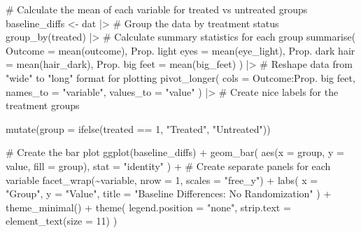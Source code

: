 \documentclass[
  letterpaper,
  DIV=11,
  numbers=noendperiod]{scrreprt}
\newenvironment{Shaded}{\begin{snugshade}}{\end{snugshade}}
\newcommand{\AttributeTok}[1]{\textcolor[rgb]{0.40,0.45,0.13}{#1}}
\newcommand{\CommentTok}[1]{\textcolor[rgb]{0.37,0.37,0.37}{#1}}
\newcommand{\DecValTok}[1]{\textcolor[rgb]{0.68,0.00,0.00}{#1}}
\newcommand{\FunctionTok}[1]{\textcolor[rgb]{0.28,0.35,0.67}{#1}}
\newcommand{\NormalTok}[1]{\textcolor[rgb]{0.00,0.23,0.31}{#1}}
\newcommand{\OtherTok}[1]{\textcolor[rgb]{0.00,0.23,0.31}{#1}}
\newcommand{\SpecialCharTok}[1]{\textcolor[rgb]{0.37,0.37,0.37}{#1}}
\newcommand{\StringTok}[1]{\textcolor[rgb]{0.13,0.47,0.30}{#1}}
\newcounter{none} %
\begin{document}
\begin{Shaded}
\begin{Highlighting}[]
\CommentTok{\# Calculate the mean of each variable for treated vs untreated groups}
\NormalTok{baseline\_diffs }\OtherTok{\textless{}{-}}\NormalTok{ dat }\SpecialCharTok{|\textgreater{}}
  \CommentTok{\# Group the data by treatment status}
  \FunctionTok{group\_by}\NormalTok{(treated) }\SpecialCharTok{|\textgreater{}}
  \CommentTok{\# Calculate summary statistics for each group}
  \FunctionTok{summarise}\NormalTok{(}
    \AttributeTok{Outcome =} \FunctionTok{mean}\NormalTok{(outcome),}
    \StringTok{\textasciigrave{}}\AttributeTok{Prop. light eyes}\StringTok{\textasciigrave{}} \OtherTok{=} \FunctionTok{mean}\NormalTok{(eye\_light),}
    \StringTok{\textasciigrave{}}\AttributeTok{Prop. dark hair}\StringTok{\textasciigrave{}} \OtherTok{=} \FunctionTok{mean}\NormalTok{(hair\_dark),}
    \StringTok{\textasciigrave{}}\AttributeTok{Prop. big feet}\StringTok{\textasciigrave{}} \OtherTok{=} \FunctionTok{mean}\NormalTok{(big\_feet)}
\NormalTok{  ) }\SpecialCharTok{|\textgreater{}}
  \CommentTok{\# Reshape data from "wide" to "long" format for plotting}
  \FunctionTok{pivot\_longer}\NormalTok{(}
    \AttributeTok{cols =}\NormalTok{ Outcome}\SpecialCharTok{:}\StringTok{\textasciigrave{}}\AttributeTok{Prop. big feet}\StringTok{\textasciigrave{}}\NormalTok{,}
    \AttributeTok{names\_to =} \StringTok{"variable"}\NormalTok{,}
    \AttributeTok{values\_to =} \StringTok{"value"}
\NormalTok{  ) }\SpecialCharTok{|\textgreater{}}
  \CommentTok{\# Create nice labels for the treatment groups}

  \FunctionTok{mutate}\NormalTok{(}\AttributeTok{group =} \FunctionTok{ifelse}\NormalTok{(treated }\SpecialCharTok{==} \DecValTok{1}\NormalTok{, }\StringTok{"Treated"}\NormalTok{, }\StringTok{"Untreated"}\NormalTok{))}

\CommentTok{\# Create the bar plot}
\FunctionTok{ggplot}\NormalTok{(baseline\_diffs) }\SpecialCharTok{+}
  \FunctionTok{geom\_bar}\NormalTok{(}
    \FunctionTok{aes}\NormalTok{(}\AttributeTok{x =}\NormalTok{ group, }\AttributeTok{y =}\NormalTok{ value, }\AttributeTok{fill =}\NormalTok{ group),}
    \AttributeTok{stat =} \StringTok{"identity"}
\NormalTok{  ) }\SpecialCharTok{+}
  \CommentTok{\# Create separate panels for each variable}
  \FunctionTok{facet\_wrap}\NormalTok{(}\SpecialCharTok{\textasciitilde{}}\NormalTok{variable, }\AttributeTok{nrow =} \DecValTok{1}\NormalTok{, }\AttributeTok{scales =} \StringTok{"free\_y"}\NormalTok{) }\SpecialCharTok{+}
  \FunctionTok{labs}\NormalTok{(}
    \AttributeTok{x =} \StringTok{"Group"}\NormalTok{,}
    \AttributeTok{y =} \StringTok{"Value"}\NormalTok{,}
    \AttributeTok{title =} \StringTok{"Baseline Differences: No Randomization"}
\NormalTok{  ) }\SpecialCharTok{+}
  \FunctionTok{theme\_minimal}\NormalTok{() }\SpecialCharTok{+}
  \FunctionTok{theme}\NormalTok{(}
    \AttributeTok{legend.position =} \StringTok{"none"}\NormalTok{,}
    \AttributeTok{strip.text =} \FunctionTok{element\_text}\NormalTok{(}\AttributeTok{size =} \DecValTok{11}\NormalTok{)}
\NormalTok{  )}
\end{Highlighting}
\end{Shaded}
\end{document}
